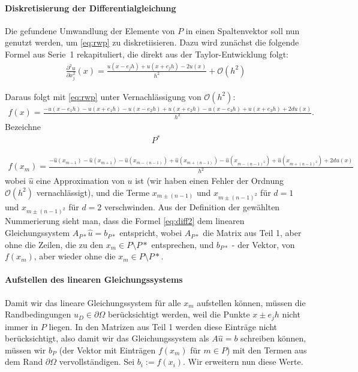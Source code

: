 \documentclass[smallheadings]{scrartcl}
\begin{document}
\paragraph{Diskretisierung der Differentialgleichung}
Die gefundene Umwandlung der Elemente von $P$ in einen Spaltenvektor soll nun genutzt werden, um \eqref{eq:rwp} zu diskretiisieren. Dazu wird zunächst die folgende Formel aus Serie~1 rekapituliert, die direkt aus der Taylor-Entwicklung folgt: 
\begin{align}
\frac{\partial^2 u}{\partial x_j^2}(x)=\frac{u(x-e_jh)+u(x+e_jh)-2u(x)}{h^2}+\mathcal{O}(h^2)
\label{eq:diff}
\end{align} 

Daraus folgt mit \eqref{eq:rwp} unter Vernachlässigung von $\mathcal{O}(h^2)$:
\begin{align}
f(x) = \frac{-u(x-e_1h)-u(x+e_1h)-u(x-e_2h)+u(x+e_2h)-u(x-e_3h)+u(x+e_3h)+2du(x)}{h^2}.
\end{align}
Bezeichne
\begin{align}
P^*
\end{align}

\begin{align}
f(x_m) = \frac{-\hat{u}(x_{m-1})-\hat{u}(x_{m+1})-\hat{u}(x_{m-(n-1)})+\hat{u}(x_{m+(n-1)})-\hat{u}(x_{m-(n-1)^2})+\hat{u}(x_{m+(n-1)^2})+2d\hat{u}(x)}{h^2}
\label{eq:diff2}
\end{align}
wobei $\hat{u}$ eine Approximation von $u$ ist (wir haben einen Fehler der Ordnung $\mathcal{O}(h^2)$ vernachlässigt), und die Terme $x_{m\pm(n-1)}$ und $x_{m\pm(n-1)^2}$ für $d=1$ und $x_{m\pm(n-1)^2}$ für $d=2$	verschwinden. Aus der Definition der gewählten Nummerierung sieht man, dass die Formel \eqref{eq:diff2} dem linearen Gleichungssystem $A_{P*}\hat{u}=b_{P*}$ entspricht, wobei $A_{P*}$ die Matrix aus Teil 1, aber ohne die Zeilen, die zu den $x_m \in P\setminus P*$ entsprechen, und  $b_{P*}$ - der Vektor, von $f(x_m)$, aber wieder ohne die $x_m \in P\setminus P*$.

\paragraph{Aufstellen des linearen Gleichungssystems}

Damit wir das lineare Gleichungssystem für alle $x_m$ aufstellen können, müssen die Randbedingungen $u_D \in \partial\Omega$ berücksichtigt werden, weil die Punkte $x \pm e_jh$ nicht immer in $P$ liegen. In den Matrizen aus Teil 1 werden diese Einträge nicht berücksichtigt, also damit wir das Gleichungssystem als $A\hat{u}=b$ schreiben können, müssen wir $b_P$ (der Vektor mit Einträgen $f(x_m)$ für $m \in P$) mit den Termen aus dem Rand $\partial\Omega$ vervollständigen. 
Sei $b_i :=f(x_i)$. Wir erweitern nun diese Werte.  
\end{document}
